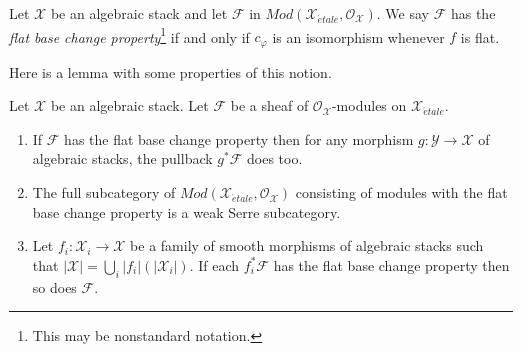 \begin{definition}
\label{definition-flat-base-change}
Let $\mathcal{X}$ be an algebraic stack and let $\mathcal{F}$ in
$\textit{Mod}(\mathcal{X}_{\acute{e}tale}, \mathcal{O}_\mathcal{X})$.
We say $\mathcal{F}$ has the {\it flat base change property}\footnote{This
may be nonstandard notation.}
if and only if $c_\varphi$ is an isomorphism whenever $f$ is flat.
\end{definition}

\noindent
Here is a lemma with some properties of this notion.

\begin{lemma}
\label{lemma-check-flat-comparison-on-etale-covering}
Let $\mathcal{X}$ be an algebraic stack. Let $\mathcal{F}$
be a sheaf of $\mathcal{O}_\mathcal{X}$-modules on
$\mathcal{X}_{\acute{e}tale}$.
\begin{enumerate}
\item If $\mathcal{F}$ has the flat base change property then for any morphism
$g : \mathcal{Y} \to \mathcal{X}$ of algebraic stacks, the
pullback $g^*\mathcal{F}$ does too.
\item The full subcategory of
$\textit{Mod}(\mathcal{X}_{\acute{e}tale}, \mathcal{O}_\mathcal{X})$
consisting of modules with the flat base change property
is a weak Serre subcategory.
\item  Let $f_i : \mathcal{X}_i \to \mathcal{X}$ be a family of
smooth morphisms of algebraic stacks such that
$|\mathcal{X}| = \bigcup_i |f_i|(|\mathcal{X}_i|)$. If each
$f_i^*\mathcal{F}$ has the flat base change property then so does
$\mathcal{F}$.
\end{enumerate}
\end{lemma}

